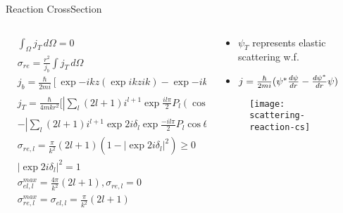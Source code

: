 \begin{frame}{Reaction CrossSection}
    \begin{columns}[T]
        \begin{column}{0.5\textwidth}
            \begin{align*}
                &\int_{\Omega}j_T\,d\Omega=0\tag{elastic}\\
                &\sigma_{re}=\frac{r^2}{j_b}\int j_T\,d\Omega\tag{non elastic: net current of particles}\\
                &j_b=\frac{\hbar}{2mi}[\exp{-ikz}(\exp{ikz}ik)-\exp{-ikz}(-ik)\exp{ikz}]=\frac{\hbar k}{m}\\
                &j_T=\frac{\hbar}{4mkr^2}[|\sum_l(2l+1)i^{l+1}\exp{\frac{il\pi}{2}}P_l(\cos{\theta})|^2\\
                &-|\sum_l(2l+1)i^{l+1}\exp{2i\delta_l}\exp{\frac{-il\pi}{2}}P_l{\cos{\theta}}|^2]\\
                &\sigma_{re,l}=\frac{\pi}{k^2}(2l+1)(1-|\exp{2i\delta_l}|^2)\geq0\\
                &|\exp{2i\delta_l}|^2=1\tag{If $\delta_l$ real: only elastic-sc}\\
                &\sigma_{el,l}^{max}=\frac{4\pi}{k^2}(2l+1), \sigma_{re,l}=0\tag{max elastic-c.s.}\\
                &\sigma_{re,l}^{max}=\sigma_{el,l}=\frac{\pi}{k^2}(2l+1)\tag{max reaction-c.s.}
            \end{align*}
        \end{column}
        \begin{column}{0.5\textwidth}
            \begin{itemize}
                \item  $\psi_T$ represents elastic scattering w.f.
                    \item $j=\frac{\hbar}{2mi}(\psi^*\TDy{r}{\psi}-\TDy{r}{\psi^*}\psi)$
                \end{itemize}
            \begin{figure}[!ht]
                \texttt{[image: scattering-reaction-cs]}\label{fig:scattering-reaction-cs}
			\end{figure}
        \end{column}
    \end{columns}
\end{frame}

